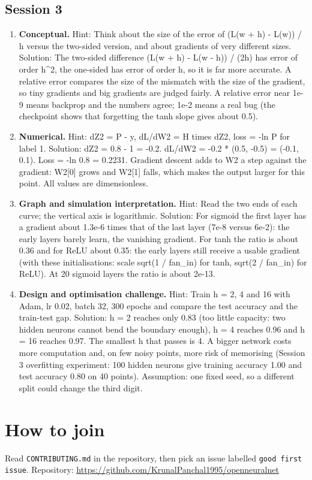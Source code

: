 \documentclass[11pt,a4paper]{article}
\begin{document}
\subsection*{Session 3}
\begin{enumerate}[nosep]
\item \textbf{Conceptual.} Hint: Think about the size of the error of (L(w + h) - L(w)) / h versus the two-sided version, and about gradients of very different sizes. Solution: The two-sided difference (L(w + h) - L(w - h)) / (2h) has error of order h\textasciicircum{}2, the one-sided has error of order h, so it is far more accurate. A relative error compares the size of the mismatch with the size of the gradient, so tiny gradients and big gradients are judged fairly. A relative error near 1e-9 means backprop and the numbers agree; 1e-2 means a real bug (the checkpoint shows that forgetting the tanh slope gives about 0.5).
\item \textbf{Numerical.} Hint: dZ2 = P - y, dL/dW2 = H times dZ2, loss = -ln P for label 1. Solution: dZ2 = 0.8 - 1 = -0.2. dL/dW2 = -0.2 * (0.5, -0.5) = (-0.1, 0.1). Loss = -ln 0.8 = 0.2231. Gradient descent adds to W2 a step against the gradient: W2[0] grows and W2[1] falls, which makes the output larger for this point. All values are dimensionless.
\item \textbf{Graph and simulation interpretation.} Hint: Read the two ends of each curve; the vertical axis is logarithmic. Solution: For sigmoid the first layer has a gradient about 1.3e-6 times that of the last layer (7e-8 versus 6e-2): the early layers barely learn, the vanishing gradient. For tanh the ratio is about 0.36 and for ReLU about 0.35: the early layers still receive a usable gradient (with these initialisations: scale sqrt(1 / fan\_in) for tanh, sqrt(2 / fan\_in) for ReLU). At 20 sigmoid layers the ratio is about 2e-13.
\item \textbf{Design and optimisation challenge.} Hint: Train h = 2, 4 and 16 with Adam, lr 0.02, batch 32, 300 epochs and compare the test accuracy and the train-test gap. Solution: h = 2 reaches only 0.83 (too little capacity: two hidden neurons cannot bend the boundary enough), h = 4 reaches 0.96 and h = 16 reaches 0.97. The smallest h that passes is 4. A bigger network costs more computation and, on few noisy points, more risk of memorising (Session 3 overfitting experiment: 100 hidden neurons give training accuracy 1.00 and test accuracy 0.80 on 40 points). Assumption: one fixed seed, so a different split could change the third digit.
\end{enumerate}

\section{How to join}
Read \texttt{CONTRIBUTING.md} in the repository, then pick an issue labelled \texttt{good first issue}. Repository: \url{https://github.com/KrunalPanchal1995/openneuralnet}
\end{document}
